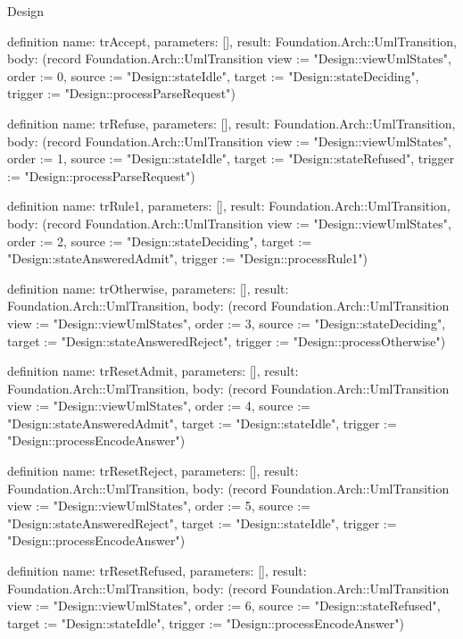 \begin{lexlean}{Design}
\begin{semanticmodule}
definition{
  name: trAccept,
  parameters: [],
  result: Foundation.Arch::UmlTransition,
  body: (record Foundation.Arch::UmlTransition {view := "Design::viewUmlStates", order := 0, source := "Design::stateIdle", target := "Design::stateDeciding", trigger := "Design::processParseRequest"})
}

definition{
  name: trRefuse,
  parameters: [],
  result: Foundation.Arch::UmlTransition,
  body: (record Foundation.Arch::UmlTransition {view := "Design::viewUmlStates", order := 1, source := "Design::stateIdle", target := "Design::stateRefused", trigger := "Design::processParseRequest"})
}

definition{
  name: trRule1,
  parameters: [],
  result: Foundation.Arch::UmlTransition,
  body: (record Foundation.Arch::UmlTransition {view := "Design::viewUmlStates", order := 2, source := "Design::stateDeciding", target := "Design::stateAnsweredAdmit", trigger := "Design::processRule1"})
}

definition{
  name: trOtherwise,
  parameters: [],
  result: Foundation.Arch::UmlTransition,
  body: (record Foundation.Arch::UmlTransition {view := "Design::viewUmlStates", order := 3, source := "Design::stateDeciding", target := "Design::stateAnsweredReject", trigger := "Design::processOtherwise"})
}

definition{
  name: trResetAdmit,
  parameters: [],
  result: Foundation.Arch::UmlTransition,
  body: (record Foundation.Arch::UmlTransition {view := "Design::viewUmlStates", order := 4, source := "Design::stateAnsweredAdmit", target := "Design::stateIdle", trigger := "Design::processEncodeAnswer"})
}

definition{
  name: trResetReject,
  parameters: [],
  result: Foundation.Arch::UmlTransition,
  body: (record Foundation.Arch::UmlTransition {view := "Design::viewUmlStates", order := 5, source := "Design::stateAnsweredReject", target := "Design::stateIdle", trigger := "Design::processEncodeAnswer"})
}

definition{
  name: trResetRefused,
  parameters: [],
  result: Foundation.Arch::UmlTransition,
  body: (record Foundation.Arch::UmlTransition {view := "Design::viewUmlStates", order := 6, source := "Design::stateRefused", target := "Design::stateIdle", trigger := "Design::processEncodeAnswer"})
}
\end{semanticmodule}
\end{lexlean}
